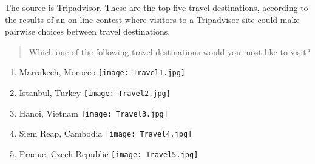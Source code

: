 The source is Tripadvisor.
These are the top five travel destinations, according to the results of an on-line contest where visitors to a Tripadvisor site could make pairwise choices between travel destinations.

\begin{tcolorbox}
\begin{quotation}
Which one of the following travel destinations would you most like to visit?
\end{quotation}

\begin{enumerate}
\item Marrakech, Morocco
\texttt{[image: Travel1.jpg]}

\item Istanbul, Turkey
\texttt{[image: Travel2.jpg]}

\item Hanoi, Vietnam
\texttt{[image: Travel3.jpg]}

\item Siem Reap, Cambodia
\texttt{[image: Travel4.jpg]}

\item Praque, Czech Republic
\texttt{[image: Travel5.jpg]}
\end{enumerate}	
\end{tcolorbox}
